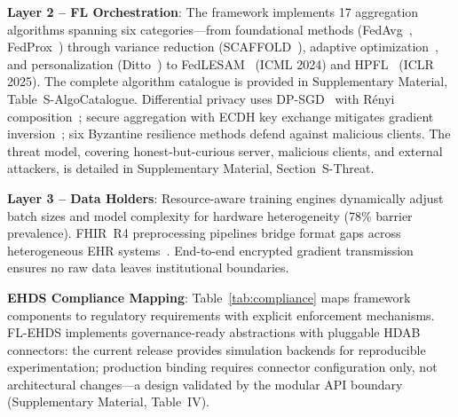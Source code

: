 \documentclass[conference,letterpaper]{IEEEtran}
\begin{document}
\textbf{Layer 2 -- FL Orchestration}: The framework implements 17 aggregation algorithms spanning six categories---from foundational methods (FedAvg~\cite{mcmahan2017communication}, FedProx~\cite{li2020federated}) through variance reduction (SCAFFOLD~\cite{karimireddy2020scaffold}), adaptive optimization~\cite{reddi2021adaptive}, and personalization (Ditto~\cite{li2021ditto}) to FedLESAM~\cite{qu2024fedlesam} (ICML 2024) and HPFL~\cite{chen2025hpfl} (ICLR 2025). The complete algorithm catalogue is provided in Supplementary Material, Table~S-AlgoCatalogue. Differential privacy uses DP-SGD~\cite{abadi2016deep} with R\'enyi composition~\cite{dwork2014dp, mironov2017renyi, wei2020federated}; secure aggregation with ECDH key exchange mitigates gradient inversion~\cite{zhu2019deep}; six Byzantine resilience methods defend against malicious clients. The threat model, covering honest-but-curious server, malicious clients, and external attackers, is detailed in Supplementary Material, Section~S-Threat.

\textbf{Layer 3 -- Data Holders}: Resource-aware training engines dynamically adjust batch sizes and model complexity for hardware heterogeneity (78\% barrier prevalence). FHIR~R4 preprocessing pipelines bridge format gaps across heterogeneous EHR systems~\cite{hussein2025interop}. End-to-end encrypted gradient transmission ensures no raw data leaves institutional boundaries.

\textbf{EHDS Compliance Mapping}: Table~\ref{tab:compliance} maps framework components to regulatory requirements with explicit enforcement mechanisms. FL-EHDS implements governance-ready abstractions with pluggable HDAB connectors: the current release provides simulation backends for reproducible experimentation; production binding requires connector configuration only, not architectural changes---a design validated by the modular API boundary (Supplementary Material, Table~IV).
\end{document}
